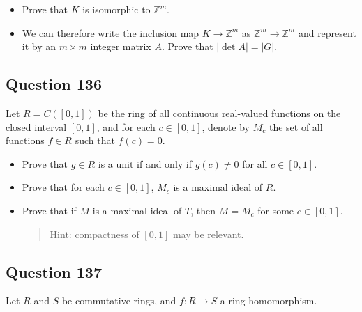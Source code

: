 \documentclass[12pt]{article}
\begin{document}
\begin{itemize}
\item
  Prove that \(K\) is isomorphic to \(\mathbb Z^m\).
\item
  We can therefore write the inclusion map \(K\rightarrow\mathbb Z^m\)
  as \(\mathbb Z^m\rightarrow\mathbb Z^m\) and represent it by an
  \(m\times m\) integer matrix \(A\). Prove that \(|\det A|=|G|\).
\end{itemize}

\hypertarget{question-136}{%
\subsection{Question 136}\label{question-136}}

Let \(R=C([0,1])\) be the ring of all continuous real-valued functions
on the closed interval \([0,1]\), and for each \(c\in[0,1]\), denote by
\(M_c\) the set of all functions \(f\in R\) such that \(f(c)=0\).

\begin{itemize}
\item
  Prove that \(g\in R\) is a unit if and only if \(g(c)\neq0\) for all
  \(c\in[0,1]\).
\item
  Prove that for each \(c\in[0,1]\), \(M_c\) is a maximal ideal of
  \(R\).
\item
  Prove that if \(M\) is a maximal ideal of \(T\), then \(M=M_c\) for
  some \(c\in[0,1]\).

  \begin{quote}
  Hint: compactness of \([0,1]\) may be relevant.
  \end{quote}
\end{itemize}

\hypertarget{question-137}{%
\subsection{Question 137}\label{question-137}}

Let \(R\) and \(S\) be commutative rings, and \(f:R\rightarrow S\) a
ring homomorphism.
\end{document}
